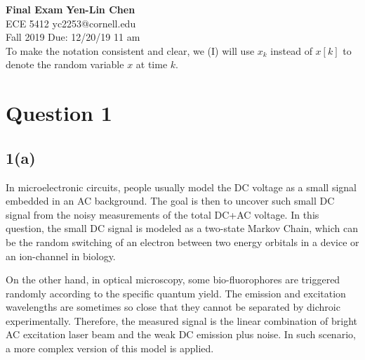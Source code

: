 \documentclass[a4paper, 11pt]{article}
\begin{document}
\noindent
\large\textbf{Final Exam} \hfill \textbf{Yen-Lin Chen} \\
\normalsize ECE 5412 \hfill yc2253@cornell.edu \\
Fall 2019 \hfill Due: 12/20/19 11 am\\

To make the notation consistent and clear, we (I) will use $x_k$ instead of $x[k]$ to denote the random variable $x$ at time $k$. 

\section*{Question 1}

\subsection*{1(a)}

In microelectronic circuits, people usually model the DC voltage as a small signal embedded in an AC background. The goal is then to uncover such small DC signal from the noisy measurements of the total DC+AC voltage. In this question, the small DC signal is modeled as a two-state Markov Chain, which can be the random switching of an electron between two energy orbitals in a device or an ion-channel in biology. 

On the other hand, in optical microscopy, some bio-fluorophores are triggered randomly according to the specific quantum yield. The emission and excitation wavelengths are sometimes so close that they cannot be separated by dichroic experimentally. Therefore, the measured signal is the linear combination of bright AC excitation laser beam and the weak DC emission plus noise. In such scenario, a more complex version of this model is applied. 
\end{document}
